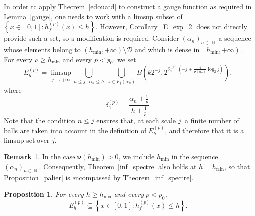 \documentclass[a4paper,11pt,oneside]{article}
\DeclareMathOperator{\N}{\mathbb{N}}
\newcommand{\coint}[1]{\left[{#1}\right)}
\newcommand{\ccint}[1]{\left[{#1}\right]}
\newcommand{\ooint}[1]{\left({#1}\right)}
\theoremstyle{definition}
\newtheorem{rem}[defi]{Remark}
\theoremstyle{plain}
\newtheorem{prop}[defi]{Proposition}
\begin{document}
In order to apply Theorem~\ref{edouard} to construct a gauge function as required in Lemma~\ref{gauge}, one needs to work with a limsup subset of 
$\left\{ x \in \ccint{0,1} : h_f^{(p)}(x) \leq h \right\}$. 
However, Corollary~\ref{E_exp_2} does not directly provide such a set, so a modification is required.
Consider $(\alpha_n)_{n\in\N}$ a sequence whose elements belong to $\ooint{h_{\min},+\infty}\setminus\mathcal{D}$ and which is dense in $\coint{h_{\min},+\infty}$. For every $h\geq h_{\min}$ and every $p<p_0$,
we set
\begin{equation}\label{eq:E}
  E_h^{(p)}=\limsup_{j\rightarrow+\infty}\bigcup_{n\leq j\,:\,\alpha_n\leq h}\;\bigcup_{k\in F_j(\alpha_n)}B\left(k2^{-j},2^{\delta_n^{(p)}\left(-j+\frac{4}{\bm{\nu}(\alpha_n)}\log_2j\right)}\right),  
\end{equation}
where
\[
\delta_n^{(p)}=\frac{\alpha_n+\frac{1}{p}}{h+\frac{1}{p}}.
\]
Note that the condition $n\leq j$ ensures that, at each scale $j$, a finite number of balls are taken into account in the definition of $E_h^{(p)}$, and therefore that it is a limsup set over $j$.

\begin{rem}\label{rem:h_min}
In the case $\bm{\nu}(h_{\min})>0$, we include $h_{\min}$ in the sequence $(\alpha_n)_{n\in\N}$. Consequently, Theorem~\ref{inf_spectre} also holds at $h = h_{\min}$, so that Proposition~\ref{palier} is encompassed by Theorem~\ref{inf_spectre}.
\end{rem}

\begin{prop}\label{intermed}
For every $h\geq h_{\min}$ and every $p<p_0$, 
\[
E^{(p)}_h\subseteq\left\{x\in\ccint{0,1}:h^{(p)}_f(x)\leq h\right\}.
\]
\end{prop}
\end{document}
